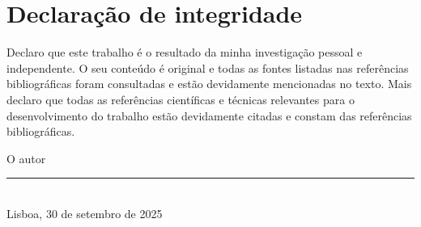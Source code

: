 
\chapter{Declaração de integridade}

Declaro que este trabalho é o resultado da minha investigação pessoal e independente. O seu conteúdo é original e todas as fontes listadas nas referências bibliográficas foram consultadas e estão devidamente mencionadas no texto. Mais declaro que todas as referências científicas e técnicas relevantes para o desenvolvimento do trabalho estão devidamente citadas e constam das referências bibliográficas.\vspace{24pt}

\begin{center}
	O autor\\\vspace{24pt}
	\rule{8cm}{.3pt}\\
	Lisboa, 30 de setembro de 2025
\end{center}

